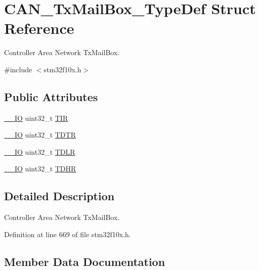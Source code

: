 \hypertarget{struct_c_a_n___tx_mail_box___type_def}{}\section{C\+A\+N\+\_\+\+Tx\+Mail\+Box\+\_\+\+Type\+Def Struct Reference}
\label{struct_c_a_n___tx_mail_box___type_def}


Controller Area Network Tx\+Mail\+Box.  




{\ttfamily \#include $<$stm32f10x.\+h$>$}

\subsection*{Public Attributes}
\begin{DoxyCompactItemize}
\item 
\hyperlink{core__sc300_8h_aec43007d9998a0a0e01faede4133d6be}{\+\_\+\+\_\+\+IO} uint32\+\_\+t \hyperlink{struct_c_a_n___tx_mail_box___type_def_a22f525c909de2dcec1d4093fe1d562b8}{T\+IR}
\item 
\hyperlink{core__sc300_8h_aec43007d9998a0a0e01faede4133d6be}{\+\_\+\+\_\+\+IO} uint32\+\_\+t \hyperlink{struct_c_a_n___tx_mail_box___type_def_a2351cb865d064cf75f61642aaa887f76}{T\+D\+TR}
\item 
\hyperlink{core__sc300_8h_aec43007d9998a0a0e01faede4133d6be}{\+\_\+\+\_\+\+IO} uint32\+\_\+t \hyperlink{struct_c_a_n___tx_mail_box___type_def_a408c96501b1cc8bd527432736d132a39}{T\+D\+LR}
\item 
\hyperlink{core__sc300_8h_aec43007d9998a0a0e01faede4133d6be}{\+\_\+\+\_\+\+IO} uint32\+\_\+t \hyperlink{struct_c_a_n___tx_mail_box___type_def_a98c6bcd7c9bae378ebf83fd9f5b59020}{T\+D\+HR}
\end{DoxyCompactItemize}


\subsection{Detailed Description}
Controller Area Network Tx\+Mail\+Box. 

Definition at line 669 of file stm32f10x.\+h.



\subsection{Member Data Documentation}
\mbox{\label{struct_c_a_n___tx_mail_box___type_def_a98c6bcd7c9bae378ebf83fd9f5b59020}} 
